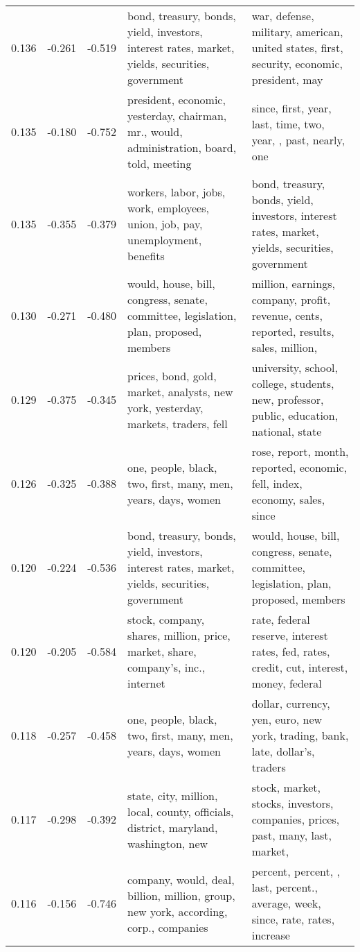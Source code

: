 \begin{tabular}{cccp{5cm}p{5cm}}
0.136 & -0.261 & -0.519 & bond, treasury, bonds, yield, investors, interest rates, market, yields, securities, government & war, defense, military, american, united states, first, security, economic, president, may \\
0.135 & -0.180 & -0.752 & president, economic, yesterday, chairman, mr., would, administration, board, told, meeting & since, first, year, last, time, two, year, , past, nearly, one \\
0.135 & -0.355 & -0.379 & workers, labor, jobs, work, employees, union, job, pay, unemployment, benefits & bond, treasury, bonds, yield, investors, interest rates, market, yields, securities, government \\
0.130 & -0.271 & -0.480 & would, house, bill, congress, senate, committee, legislation, plan, proposed, members & million, earnings, company, profit, revenue, cents, reported, results, sales, million,  \\
0.129 & -0.375 & -0.345 & prices, bond, gold, market, analysts, new york, yesterday, markets, traders, fell & university, school, college, students, new, professor, public, education, national, state \\
0.126 & -0.325 & -0.388 & one, people, black, two, first, many, men, years, days, women & rose, report, month, reported, economic, fell, index, economy, sales, since \\
0.120 & -0.224 & -0.536 & bond, treasury, bonds, yield, investors, interest rates, market, yields, securities, government & would, house, bill, congress, senate, committee, legislation, plan, proposed, members \\
0.120 & -0.205 & -0.584 & stock, company, shares, million, price, market, share, company's, inc., internet & rate, federal reserve, interest rates, fed, rates, credit, cut, interest, money, federal \\
0.118 & -0.257 & -0.458 & one, people, black, two, first, many, men, years, days, women & dollar, currency, yen, euro, new york, trading, bank, late, dollar's, traders \\
0.117 & -0.298 & -0.392 & state, city, million, local, county, officials, district, maryland, washington, new & stock, market, stocks, investors, companies, prices, past, many, last, market,  \\
0.116 & -0.156 & -0.746 & company, would, deal, billion, million, group, new york, according, corp., companies & percent, percent, , last, percent., average, week, since, rate, rates, increase \\

\end{tabular}
